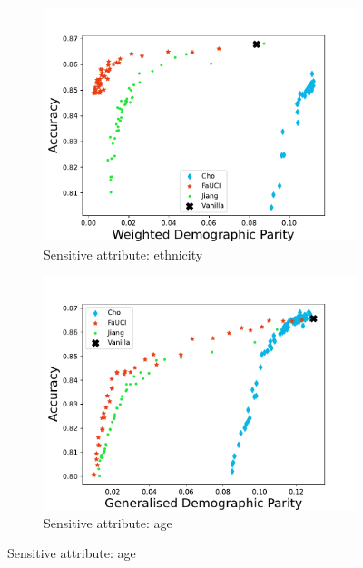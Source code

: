 \begin{figure}
\begin{subfigure}[]{\onethirdsize}
        \includegraphics[width=\columnwidth]{figures/fauci/accuracy/demographic_parity_ethnicity}
        \caption{Sensitive attribute: ethnicity}
        \label{fig:dp-ethnicity}
    \end{subfigure}
    \begin{subfigure}[]{\onethirdsize}
        \centering
        \includegraphics[width=\columnwidth]{figures/fauci/accuracy/demographic_parity_age}
        \caption{Sensitive attribute: age}
        \label{fig:dp-age}
    \end{subfigure}
    \label{fig:dp}


\end{figure}
